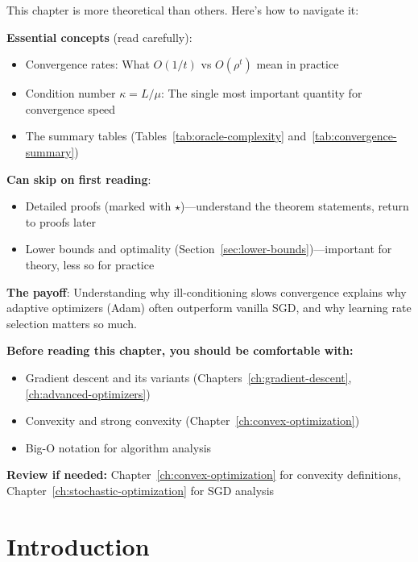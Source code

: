 \documentclass[../../main.tex]{subfiles}
\begin{document}
\begin{intuition}
This chapter is more theoretical than others. Here's how to navigate it:

\textbf{Essential concepts} (read carefully):
\begin{itemize}
    \item Convergence rates: What $O(1/t)$ vs $O(\rho^t)$ mean in practice
    \item Condition number $\kappa = L/\mu$: The single most important quantity for convergence speed
    \item The summary tables (Tables~\ref{tab:oracle-complexity} and~\ref{tab:convergence-summary})
\end{itemize}

\textbf{Can skip on first reading}:
\begin{itemize}
    \item Detailed proofs (marked with $\star$)---understand the theorem statements, return to proofs later
    \item Lower bounds and optimality (Section~\ref{sec:lower-bounds})---important for theory, less so for practice
\end{itemize}

\textbf{The payoff}: Understanding why ill-conditioning slows convergence explains why adaptive optimizers (Adam) often outperform vanilla SGD, and why learning rate selection matters so much.
\end{intuition}

\begin{prerequisites}
\textbf{Before reading this chapter, you should be comfortable with:}
\begin{itemize}
    \item Gradient descent and its variants (Chapters~\ref{ch:gradient-descent}, \ref{ch:advanced-optimizers})
    \item Convexity and strong convexity (Chapter~\ref{ch:convex-optimization})
    \item Big-O notation for algorithm analysis
\end{itemize}
\textbf{Review if needed:} Chapter~\ref{ch:convex-optimization} for convexity definitions, Chapter~\ref{ch:stochastic-optimization} for SGD analysis
\end{prerequisites}

\section{Introduction}
\label{sec:conv-intro}
\end{document}
